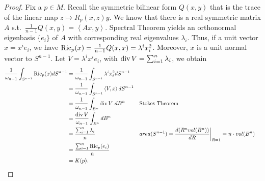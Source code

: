 \documentclass[12pt]{article}
\begin{document}
\begin{proof}
Fix a $ p \in M$. Recall the symmetric bilinear form $ Q(x,y)$ that is the trace of the linear map $ z \mapsto R_p(x,z)y$. We know that there is a real symmetric matrix $ A$  s.t.\ $ \frac{1}{n-1}Q(x,y) = \left\langle Ax, y  \right\rangle$. Spectral Theorem yields an orthonormal eigenbasis $ \{e_i\} $ of $ A$ with corresponding real eigenvalues $ \lambda_i$.  Thus, if a unit vector $ x = x^{i} e_i$, we have $ \operatorname{Ric}_p(x) =  \frac{1}{n-1}Q(x,x) = \lambda^i x_{i}^2$. Moreover, $ x$ is a unit normal vector to  $ S^{n-1}$. Let $ V = \lambda^{i}x^{i} e_i $, with $ \operatorname{div} V = \sum_{ i= 1}^{ n} \lambda_i $, we obtain
\begin{align*}
	\frac{1}{\omega_{n-1}} \int_{S^{n-1}} \Ric_p(x) dS^{n-1} &= \frac{1}{\omega_{n-1}} \int_{S^{n-1}} \lambda^{i} x_i^2 dS^{n-1}\\
	&= \frac{1}{\omega_{n-1}} \int_{S^{n-1}} \left\langle V, x \right\rangle dS^{n-1} \\
	&= \frac{1}{\omega_{n-1}} \int_{B^{n}} \Div V \ dB^{n}  && \text{Stokes Theorem} \\
	&= \frac{ \Div V }{ \omega_{n-1}} \int_{B^{n}} dB^{n}  \\
	&= \frac{ \sum_{ i= 1}^{ n}  \lambda_i}{n}  && area(S^{n-1}) = \frac{d (R^{n}vol(B^{n}))}{d R}\bigg|_{R=1} = n \cdot  vol(B^{n}) \\
	&= \frac{ \sum_{ i= 1}^{ n} \Ric_p(e_i)}{n}  \\
	&= K(p) .
\end{align*}
\end{proof}
\end{document}
